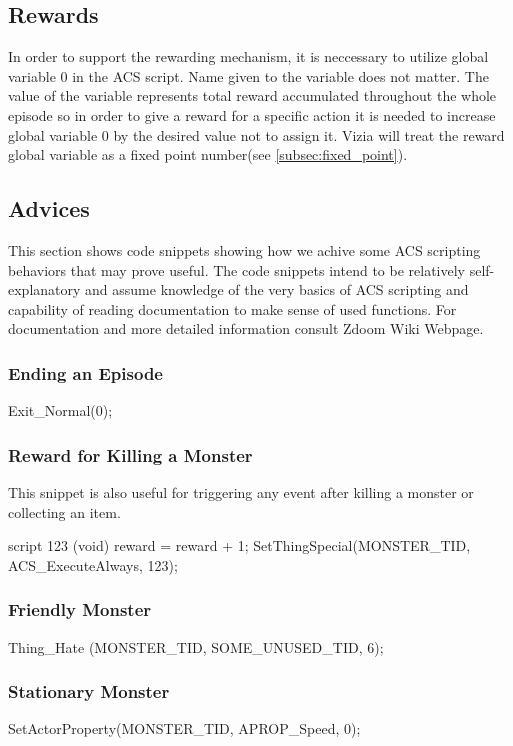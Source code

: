 	\subsection{Rewards}
		In order to support the rewarding mechanism, it is neccessary to utilize global variable 0 in the ACS script. Name given to the variable does not matter. The value of the variable represents total reward accumulated throughout the whole episode so in order to give a reward for a specific action it is needed to increase global variable 0 by the desired value not to assign it. Vizia will treat the reward global variable as a fixed point number(see \ref{subsec:fixed_point}).

	\subsection{Advices}
		This section shows code snippets showing how we achive some ACS scripting behaviors that may prove useful. The code snippets intend to be relatively self-explanatory and assume knowledge of the very basics of ACS scripting and capability of reading documentation to make sense of used functions. For documentation and more detailed information consult Zdoom Wiki Webpage\cite{zdoom-wiki}.

		\subsubsection*{Ending an Episode}

			\begin{clinee}
Exit_Normal(0);
			\end{clinee}
		\subsubsection*{Reward for Killing a Monster} This snippet is also useful for triggering any event after killing a monster or collecting an item.
			\begin{clinee}
script 123 (void)
{
	reward = reward + 1;
}
SetThingSpecial(MONSTER_TID, ACS_ExecuteAlways, 123);
			\end{clinee}
\subsubsection*{Friendly Monster}
			\begin{clinee}
Thing_Hate (MONSTER_TID, SOME_UNUSED_TID, 6);
			\end{clinee}
		\subsubsection*{Stationary Monster}
			\begin{clinee}
SetActorProperty(MONSTER_TID, APROP_Speed, 0);
			\end{clinee}
